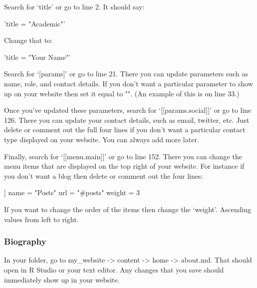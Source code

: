 \documentclass[
]{book}
\newenvironment{Shaded}{\begin{snugshade}}{\end{snugshade}}
\newcommand{\DecValTok}[1]{\textcolor[rgb]{0.00,0.00,0.81}{#1}}
\newcommand{\NormalTok}[1]{#1}
\newcommand{\StringTok}[1]{\textcolor[rgb]{0.31,0.60,0.02}{#1}}
\begin{document}
Search for `title' or go to line 2. It should say:

\begin{Shaded}
\begin{Highlighting}[]
\StringTok{'title = "Academic"'}
\end{Highlighting}
\end{Shaded}

Change that to:

\begin{Shaded}
\begin{Highlighting}[]
\StringTok{'title = "Your Name"'}
\end{Highlighting}
\end{Shaded}

Search for `{[}params{]}' or go to line 21. There you can update parameters such as name, role, and contact details. If you don't want a particular parameter to show up on your website then set it equal to "". (An example of this is on line 33.)

Once you've updated these parameters, search for `{[}{[}params.social{]}{]}' or go to line 126. There you can update your contact details, such as email, twitter, etc. Just delete or comment out the full four lines if you don't want a particular contact type displayed on your website. You can always add more later.

Finally, search for `{[}{[}menu.main{]}{]}' or go to line 152. There you can change the menu items that are displayed on the top right of your website. For instance if you don't want a blog then delete or comment out the four lines:

\begin{Shaded}
\begin{Highlighting}[]
\NormalTok{[[menu.main]]}
\NormalTok{  name =}\StringTok{ "Posts"}
\NormalTok{  url =}\StringTok{ "#posts"}
\NormalTok{  weight =}\StringTok{ }\DecValTok{3}
\end{Highlighting}
\end{Shaded}

If you want to change the order of the items then change the `weight'. Ascending values from left to right.

\hypertarget{biography}{%
\subsubsection{Biography}\label{biography}}

In your folder, go to my\_website -\textgreater{} content -\textgreater{} home -\textgreater{} about.md. That should open in R Studio or your text editor. Any changes that you save should immediately show up in your website.
\end{document}
